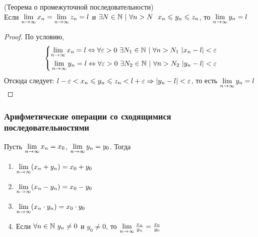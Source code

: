 \begin{theorem} (Теорема о промежуточной последовательности)\\
    Если $\lim\limits_{n \to \infty} x_n = \lim\limits_{n \to \infty} z_n = l$ и $\exists N \in \N\ |\ \forall n > N\ \ x_n \le y_n \le z_n$, то $\lim\limits_{n \to \infty} y_n = l$
\end{theorem}

\begin{proof}
    По условию,
    $$
        \left\{\begin{aligned}
        \lim\limits_{n \to \infty} x_n = l \Leftrightarrow \forall \varepsilon > 0\ \exists N_1 \in \mathbb{N}\ |\ \forall n > N_1\ |x_n - l| < \varepsilon
        \\
        \lim\limits_{n \to \infty} y_n = l \Leftrightarrow \forall \varepsilon > 0\ \exists N_2 \in \mathbb{N}\ |\ \forall n > N_2\ |y_n - l| < \varepsilon
        \end{aligned}\right.
    $$
    Отсюда следует: $l - \varepsilon < x_n \leqslant y_n \leqslant z_n < l + \varepsilon \Rightarrow |y_n - l| < \varepsilon$, то есть $\lim\limits_{n \to \infty} y_n = l$
\end{proof}

\subsubsection*{Арифметические операции со сходящимися последовательностями}

Пусть $\lim\limits_{n \to \infty} x_n = x_0$, $\lim\limits_{n \to \infty} y_n = y_0$. Тогда

\begin{enumerate}
	\item $\lim\limits_{n \to \infty} (x_n + y_n) = x_0 + y_0$
	\item $\lim\limits_{n \to \infty} (x_n - y_n) = x_0 - y_0$
	\item $\lim\limits_{n \to \infty} (x_n \cdot y_n) = x_0 \cdot y_0$
	\item Если $\forall n \in \mathbb{N}\ y_n \neq 0$ и $y_0 \neq 0$, то $\lim\limits_{n \to \infty} \frac{x_n}{y_n} = \frac{x_0}{y_0}$
\end{enumerate}

